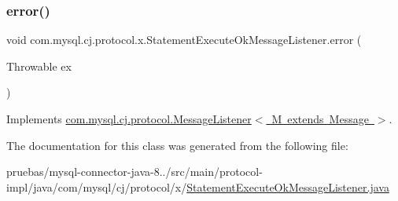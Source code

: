 \mbox{\label{classcom_1_1mysql_1_1cj_1_1protocol_1_1x_1_1_statement_execute_ok_message_listener_abce681bc363086c23732d92c3fb8bce9}} 
\subsubsection{\texorpdfstring{error()}{error()}}
{\footnotesize\ttfamily void com.\+mysql.\+cj.\+protocol.\+x.\+Statement\+Execute\+Ok\+Message\+Listener.\+error (\begin{DoxyParamCaption}\item[{Throwable}]{ex }\end{DoxyParamCaption})}



Implements \mbox{\hyperlink{interfacecom_1_1mysql_1_1cj_1_1protocol_1_1_message_listener_a9e06f02beaf29eb065149ac4f819761f}{com.\+mysql.\+cj.\+protocol.\+Message\+Listener$<$ M extends Message $>$}}.



The documentation for this class was generated from the following file\+:\begin{DoxyCompactItemize}
\item 
pruebas/mysql-\/connector-\/java-\/8../src/main/protocol-\/impl/java/com/mysql/cj/protocol/x/\mbox{\hyperlink{_statement_execute_ok_message_listener_8java}{Statement\+Execute\+Ok\+Message\+Listener.\+java}}\end{DoxyCompactItemize}
